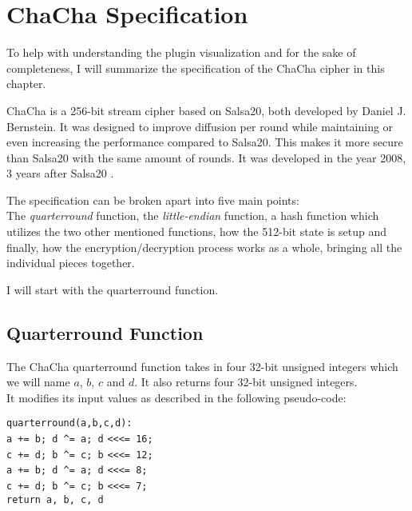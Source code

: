 \chapter{ChaCha Specification}
\label{chap:chacha}

To help with understanding the plugin visualization and for the sake of completeness, I will summarize the specification of the ChaCha cipher in this chapter.

ChaCha is a 256-bit stream cipher based on Salsa20, both developed by Daniel J. Bernstein. It was designed to improve diffusion per round while maintaining or even increasing the performance compared to Salsa20. This makes it more secure than Salsa20 with the same amount of rounds. It was developed in the year 2008, 3 years after Salsa20 \cite{chachaspec}.

The specification can be broken apart into five main points: \\
The \textit{quarterround} function, the \textit{little-endian} function, a hash function which utilizes the two other mentioned functions, how the 512-bit state is setup and finally, how the encryption/decryption process works as a whole, bringing all the individual pieces together. 

I will start with the quarterround function.

\section{Quarterround Function}
\label{sec:chacha.qr}

The ChaCha quarterround function takes in four 32-bit unsigned integers which we will name $a$, $b$, $c$ and $d$. It also returns four 32-bit unsigned integers.\\
It modifies its input values as described in the following pseudo-code:

\begin{center}
\begin{minipage}{0.5\linewidth}
\texttt{quarterround(a,b,c,d):} \\
\hspace*{1em}\texttt{a += b; d  \^{}= a; d} \verb|<<<|\texttt{= 16;} \\
\hspace*{1em}\texttt{c += d; b \^{}= c; b} \verb|<<<|\texttt{= 12;} \\
\hspace*{1em}\texttt{a += b; d \^{}= a; d} \verb|<<<|\texttt{= 8;} \\
\hspace*{1em}\texttt{c += d; b \^{}= c; b} \verb|<<<|\texttt{= 7;} \\
\hspace*{1em}\texttt{return a, b, c, d}
\end{minipage}
\end{center}

